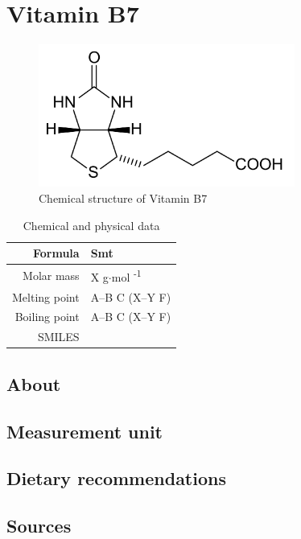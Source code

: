 \documentclass{book}
\begin{document}
\chapter{Vitamin B7}
\begin{figure}[h]
	\caption{Chemical structure of Vitamin B7}
	\centering \includegraphics[width=0.75\textwidth]{images/Vitamin_B7_chemical_structure}
\end{figure}

\begin{table}[h]
	\caption{Chemical and physical data}
	\centering \begin{tabular}{| r | l |}
		\hline
		Formula & Smt\\ \hline
		Molar mass & X g$\cdot$mol \textsuperscript{-1}\\ \hline
		Melting point & A--B \degree C (X--Y \degree F)\\ \hline
		Boiling point & A--B \degree C (X--Y \degree F)\\ \hline
		SMILES & \\ \hline
	\end{tabular}
\end{table}
\newpage

\section{About}


\section{Measurement unit}


\section{Dietary recommendations}


\section{Sources}
\end{document}
